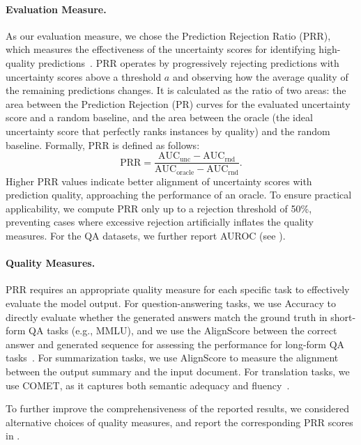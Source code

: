 \paragraph{Evaluation Measure.}
As our evaluation measure, we chose the Prediction Rejection Ratio (PRR), which measures the effectiveness of the uncertainty scores for identifying high-quality predictions~\cite{malinin2021uncertainty}. PRR operates by progressively rejecting predictions with uncertainty scores above a threshold $a$ and observing how the average quality of the remaining predictions changes. It is calculated as the ratio of two areas: the area between the Prediction Rejection (PR) curves for the evaluated uncertainty score and a random baseline, and the area between the oracle (the ideal uncertainty score that perfectly ranks instances by quality) and the random baseline. Formally, PRR is defined as follows:
\begin{equation}
  \mathrm{PRR} = \frac{\mathrm{AUC}_{\mathrm{unc}} - \mathrm{AUC}_{\mathrm{rnd}}}{\mathrm{AUC}_{\mathrm{oracle}} - \mathrm{AUC}_{\mathrm{rnd}}}.
  \label{eq:prr}
\end{equation}
Higher PRR values indicate better alignment of uncertainty scores with prediction quality, approaching the performance of an oracle. To ensure practical applicability, we compute PRR only up to a rejection threshold of 50\%, preventing cases where excessive rejection artificially inflates the quality measures. For the QA datasets, we further report AUROC (see ).

\paragraph{Quality Measures.}
PRR requires an appropriate quality measure for each specific task to effectively evaluate the model output. For question-answering tasks, we use Accuracy to directly evaluate whether the generated answers match the ground truth in short-form QA tasks (e.g., MMLU), and we use the AlignScore between the correct answer and generated sequence for assessing the performance for long-form QA tasks~\cite{zha2023alignscore}. For summarization tasks, we use AlignScore to measure the alignment between the output summary and the input document. For translation tasks, we use COMET, as it captures both semantic adequacy and fluency~\cite{rei2020comet}.

To further improve the comprehensiveness of the reported results, we considered alternative choices of quality measures, and report the corresponding PRR scores in .


